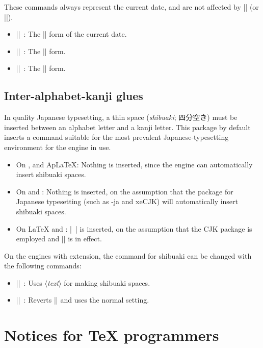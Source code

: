 \documentclass[a4paper]{article}
\newcommand{\Pkg}[1]{\textsf{#1}}
\newcommand{\Meta}[1]{$\langle$\textit{#1}$\rangle$}
\newcommand{\Means}{~:\quad}
\newcommand*{\Ja}[1]{{\fIpaex#1}}
\newcommand*{\+}{\hspace{0.25em minus 0.25em}}
\begin{document}
These commands always represent the current date,
and are not affected by |\warekisetdate| (or |\warekisettoday|).

\begin{itemize}
\item |\warekitoday|\Means
  The |\warekidate| form of the current date.
\item |\warekikanjitoday|\Means
  The |\warekikanjidate| form.
\item |\warekijkanjitoday|\Means
  The |\warekijkanjidate| form.
\end{itemize}

\subsection{Inter-alphabet-kanji glues}

In quality Japanese typesetting, a thin space
(\emph{shibuaki}; \Ja{四分空き}) must be inserted
between an alphabet letter and a kanji letter.
This package by default inserts a command
suitable for the most prevalent Japanese-typesetting environment
for the engine in use.

\begin{itemize}
\item On {\pLaTeX}, {\upLaTeX} and {Ap\LaTeX}:
  Nothing is inserted,
  since the engine can automatically insert shibuaki spaces.
\item On {\LuaLaTeX} and {\XeLaTeX}:
  Nothing is inserted,
  on the assumption that the package for Japanese typesetting
  (such as \Pkg{\LuaTeX-ja} and \Pkg{xeCJK})
  will automatically insert shibuaki spaces.
\item On {\LaTeX} and {\pdfLaTeX}:
  |~| is inserted,
  on the assumption that the \Pkg{CJK} package is employed
  and |\CJKtilde| is in effect.
\end{itemize}

On the engines with {\eTeX} extension,
the command for shibuaki can be changed with the following commands:
\begin{itemize}
\item |\WarekiUseCustomInterGlue{|\Meta{text}|}|\Means
  Uses \Meta{text} for making shibuaki spaces.
\item |\WarekiUseNormalInterGlue|\Means
  Reverts |\WarekiUseCustomInterGlue|
  and uses the normal setting.
\end{itemize}

\section{Notices for {\TeX} programmers}
\label{sec:Allez}
\end{document}
